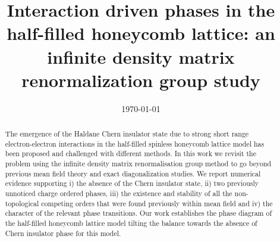 \documentclass[aps,prx,10pt,twocolumn,floatfix,superscriptaddress,showpacs,numerical,footinbib]{revtex4-1}
\newcommand{\noteAG}[1]{{\color{blue} [AG: #1]}}
\newcommand{\noteFP}[1]{{\color{magenta} [FP: #1]}}
\newcommand{\noteJM}[1]{{\color{red} [JM: #1]}}
\newcommand{\noteFdJ}[1]{{\color{cyan} [FdJ: #1]}}
\begin{document}
%
\title{Interaction driven phases in the half-filled honeycomb lattice: an infinite density matrix renormalization group study}
%
%
\date{\today}
%
\begin{abstract}
%
%
The emergence of the Haldane Chern insulator state due to strong short range electron-electron interactions in the half-filled spinless honeycomb lattice
model has been proposed and challenged with different methods.
%
In this work we revisit the problem using the infinite density matrix renormalisation group method to go beyond previous mean field theory and exact
diagonalization studies.
%
We report numerical evidence supporting 
i) the absence of the Chern insulator state, 
ii) two previously unnoticed charge ordered phases, 
iii) the existence and stability of all the non-topological competing orders that were found previously within mean field and
iv) the character of the relevant phase transitions.
%
Our work establishes the phase diagram of the half-filled honeycomb lattice model tilting the balance
towards the absence of Chern insulator phase for this model.
%
%
\end{abstract}
%
\maketitle
%
\end{document}
